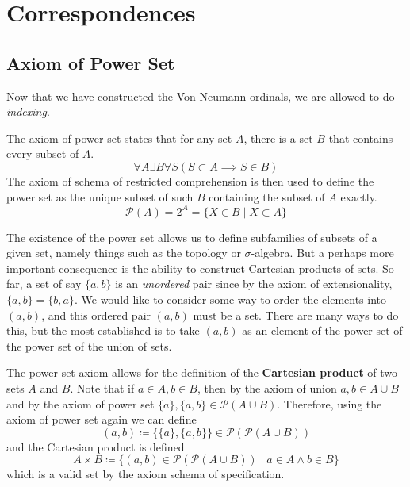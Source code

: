 \section{Correspondences} 

\subsection{Axiom of Power Set}

  Now that we have constructed the Von Neumann ordinals, we are allowed to do \textit{indexing}. 

  \begin{axiom}
    The axiom of power set states that for any set $A$, there is a set $B$ that contains every subset of $A$. 
    \begin{equation}
      \forall A \exists B \forall S (S \subset A \implies S \in B)
    \end{equation}
    The axiom of schema of restricted comprehension is then used to define the power set as the unique subset of such $B$ containing the subset of $A$ exactly. 
    \begin{equation}
      \mathcal{P}(A) = 2^A = \{X \in B \mid X \subset A \}
    \end{equation}
  \end{axiom} 

  The existence of the power set allows us to define subfamilies of subsets of a given set, namely things such as the topology or $\sigma$-algebra. But a perhaps more important consequence is the ability to construct Cartesian products of sets. So far, a set of say $\{a, b\}$ is an \textit{unordered} pair since by the axiom of extensionality, $\{a, b\} = \{b, a\}$. We would like to consider some way to order the elements into $(a, b)$, and this ordered pair $(a, b)$ must be a set. There are many ways to do this, but the most established is to take $(a, b)$ as an element of the power set of the power set of the union of sets. 

  \begin{definition}
    The power set axiom allows for the definition of the \textbf{Cartesian product} of two sets $A$ and $B$. Note that if $a \in A, b \in B$, then by the axiom of union $a, b \in A \cup B$ and by the axiom of power set $\{a\}, \{a, b\} \in \mathcal{P}(A \cup B)$. Therefore, using the axiom of power set again we can define
    \begin{equation}
      (a, b) \coloneqq \{\{a\}, \{a, b\}\} \in \mathcal{P}(\mathcal{P}(A \cup B))
    \end{equation} 
    and the Cartesian product is defined 
    \begin{equation}
      A \times B \coloneqq \{ (a, b) \in \mathcal{P}(\mathcal{P}(A \cup B)) \mid a \in A \land b \in B \}
    \end{equation}
    which is a valid set by the axiom schema of specification. 
  \end{definition} 


